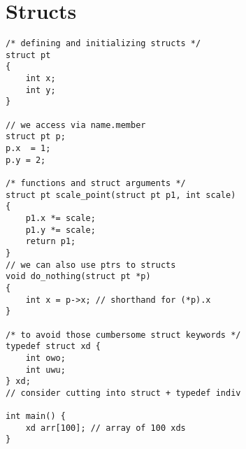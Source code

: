 \section{Structs}
\begin{verbatim}
/* defining and initializing structs */
struct pt
{
    int x;
    int y;
}

// we access via name.member
struct pt p;
p.x  = 1;
p.y = 2;

/* functions and struct arguments */
struct pt scale_point(struct pt p1, int scale)
{
    p1.x *= scale;
    p1.y *= scale;
    return p1;
}
// we can also use ptrs to structs
void do_nothing(struct pt *p)
{
    int x = p->x; // shorthand for (*p).x
}

/* to avoid those cumbersome struct keywords */
typedef struct xd {
    int owo;
    int uwu;
} xd;
// consider cutting into struct + typedef indiv

int main() {
    xd arr[100]; // array of 100 xds
}
\end{verbatim}